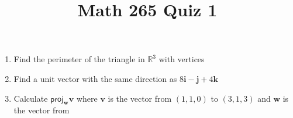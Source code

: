\documentclass[12pt]{article}
\title{Math 265 Quiz 1}\author{}
\begin{document}
\maketitle
\pagestyle{empty}
\begin{enumerate}
\item Find the perimeter of the triangle in $\mathbb{R}^3$
with vertices
\item Find a unit vector with the same direction as
$8\mathbf{i}-\mathbf{j}+4\mathbf{k}$
\item Calculate $\mathsf{proj}_\mathbf{w}\mathbf{v}$
where $\mathbf{v}$ is the vector from $\left(1,1,0\right)$
to $\left(3,1,3\right)$ and $\mathbf{w}$ is the vector from

\end{enumerate}
\end{document}
